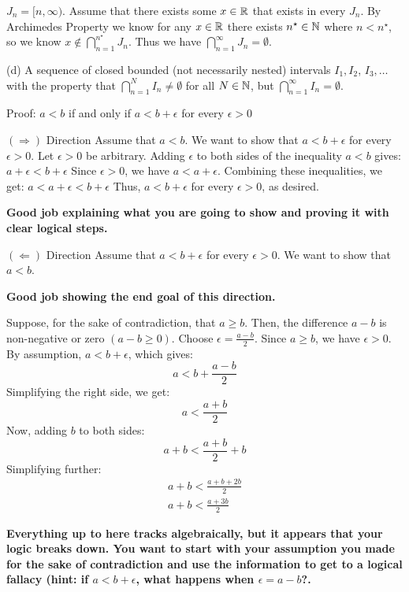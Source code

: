 \documentclass{report}
\begin{document}
$J_n = [n, \infty)$. Assume that there exists some $x \in \RR$ that exists in every $J_n$. By Archimedes Property we know for any $x \in \RR$ there exists $n^\star \in \NN$ where $ n < n^\star$, so we know $x \not\in \bigcap_{n=1}^{n^\star} J_n$. Thus we have $\bigcap_{n=1}^{\infty} J_n = \emptyset.$ 

\par \bigskip
(d) A sequence of closed bounded (not necessarily nested) intervals $I_1, I_2$, $I_3, \ldots$ with the property that $\bigcap_{n=1}^N I_n \neq \emptyset$ for all $N \in \NN$, but $\bigcap_{n=1}^{\infty} I_n=\emptyset$.

Proof: $a<b$ if and only if $a<b+\epsilon$ for every $\epsilon>0$
\par
$(\Rightarrow)$ Direction
Assume that $a<b$. We want to show that $a<b+\epsilon$ for every $\epsilon>0$.
Let $\epsilon>0$ be arbitrary. Adding $\epsilon$ to both sides of the inequality $a<b$ gives: $a+\epsilon<b+\epsilon$
Since $\epsilon>0$, we have $a<a+\epsilon$. Combining these inequalities, we get: $a<a+\epsilon<b+\epsilon$
Thus, $a<b+\epsilon$ for every $\epsilon>0$, as desired.

\textbf{Good job explaining what you are going to show and proving it with clear logical steps.}
\bigskip
\par
$(\Leftarrow)$ Direction
Assume that $a<b+\epsilon$ for every $\epsilon>0$. We want to show that $a<b$.

\textbf{Good job showing the end goal of this direction.}

Suppose, for the sake of contradiction, that $a \geq b$. Then, the difference $a-b$ is non-negative or zero $(a-b \geq 0)$.
Choose $\epsilon=\frac{a-b}{2}$. Since $a \geq b$, we have $\epsilon>0$. By assumption, $a<b+\epsilon$, which gives:
$$
a<b+\frac{a-b}{2}
$$
Simplifying the right side, we get:
$$
a<\frac{a+b}{2}
$$
Now, adding $b$ to both sides:
$$
a+b<\frac{a+b}{2}+b
$$
Simplifying further:
$$
\begin{gathered}
a+b<\frac{a+b+2 b}{2} \\
a+b<\frac{a+3 b}{2}
\end{gathered}
$$

\textbf{Everything up to here tracks algebraically, but it appears that your logic breaks down. You want to start with your assumption you made for the sake of contradiction and use the information to get to a logical fallacy (hint: if $ a < b + \epsilon$, what happens when $\epsilon = a - b$?.
}
\end{document}

